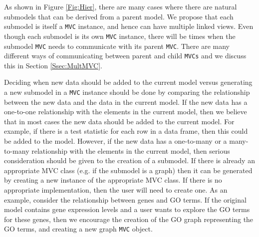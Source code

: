 \documentclass[11pt]{article}
\newcommand{\Robject}[1]{{\texttt{#1}}}
\begin{document}


As shown in Figure \ref{Fig:Hier}, there are many cases where there are
natural submodels that can be derived from a parent model.  We propose that
each submodel is itself a \Robject{MVC} instance, and hence can have multiple
linked views.  Even though each submodel is its own \Robject{MVC} instance,
there will be times when the submodel \Robject{MVC} needs to communicate with
its parent \Robject{MVC}.  There are many different ways of communicating
between parent and child \Robject{MVCs} and we discuss this in Section
\ref{Ssec:MultMVC}.

Deciding when new data should be added to the current model versus generating
a new submodel in a \Robject{MVC} instance should be done by comparing the
relationship between the new data and the data in the current model.  If the
new data has a one-to-one relationship with the elements in the current model,
then we believe that in most cases the new data should be added to the 
current model.  For example, if there is
a test statistic for each row in a data frame, then this could be added to the
model.  However, if the new data has a one-to-many or a many-to-many
relationship with the elements in the current model, then serious
consideration should be given to the creation of a submodel.  If there is
already an appropriate MVC class (e.g. if the submodel is a graph) then it can
be generated by creating a new instance of the appropriate MVC class.  If there
is no appropriate implementation, then the user will need to create one.  
As an example, consider the
relationship between genes and GO terms.  If the original model contains gene
expression levels and a user wants to explore the GO terms for these genes,
then we encourage the creation of the GO graph representing the GO terms, and
creating a new graph \Robject{MVC} object.
\end{document}
